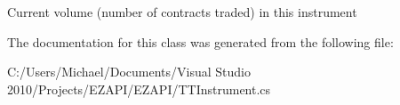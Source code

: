 Current volume (number of contracts traded) in this instrument 



The documentation for this class was generated from the following file\-:\begin{DoxyCompactItemize}
\item 
C\-:/\-Users/\-Michael/\-Documents/\-Visual Studio 2010/\-Projects/\-E\-Z\-A\-P\-I/\-E\-Z\-A\-P\-I/T\-T\-Instrument.\-cs\end{DoxyCompactItemize}
